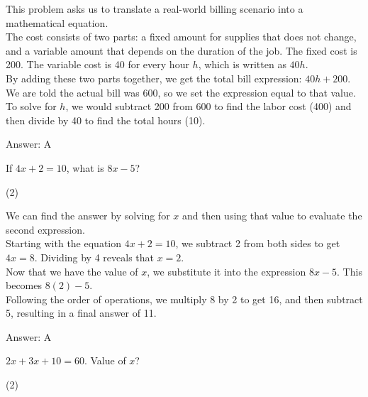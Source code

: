 \documentclass[11pt,paper=a4,answers]{exam}
\begin{document}
\begin{questions}
\begin{solution}
This problem asks us to translate a real-world billing scenario into a mathematical equation. 
\\[10pt]
The cost consists of two parts: a fixed amount for supplies that does not change, and a variable amount that depends on the duration of the job. The fixed cost is 200. The variable cost is 40 for every hour $h$, which is written as $40h$. 
\\[10pt]
By adding these two parts together, we get the total bill expression: $40h + 200$. We are told the actual bill was 600, so we set the expression equal to that value. 
\\[10pt]
To solve for $h$, we would subtract 200 from 600 to find the labor cost (400) and then divide by 40 to find the total hours (10).

\vspace{15pt}
Answer: \colorbox{yellow!100}{A}
\end{solution}

\question
If $4x + 2 = 10$, what is $8x - 5$?
\begin{tasks}(2)
\end{tasks}

\begin{solution}
We can find the answer by solving for $x$ and then using that value to evaluate the second expression. 
\\[10pt]
Starting with the equation $4x + 2 = 10$, we subtract 2 from both sides to get $4x = 8$. Dividing by 4 reveals that $x = 2$. 
\\[10pt]
Now that we have the value of $x$, we substitute it into the expression $8x - 5$. This becomes $8(2) - 5$. 
\\[10pt]
Following the order of operations, we multiply 8 by 2 to get 16, and then subtract 5, resulting in a final answer of 11.

\vspace{15pt}
Answer: \colorbox{yellow!100}{A}
\end{solution}

\question
$2x + 3x + 10 = 60$. Value of $x$?
\begin{tasks}(2)
\end{tasks}


\end{questions}
\end{document}
